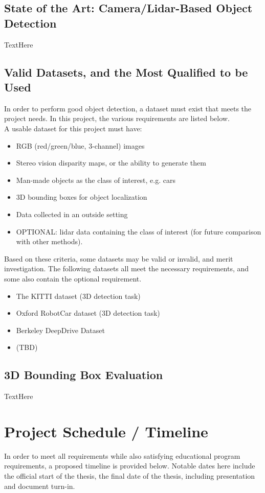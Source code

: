 \subsection{State of the Art: Camera/Lidar-Based Object Detection}
TextHere

\subsection{Valid Datasets, and the Most Qualified to be Used}
In order to perform good object detection, a dataset must exist that meets the project needs. In this project, the various requirements are listed below. \\

A usable dataset for this project must have: 
\begin{itemize} \itemsep=-0.5em
    \item RGB (red/green/blue, 3-channel) images
    \item Stereo vision disparity maps, or the ability to generate them
    \item Man-made objects as the class of interest, e.g. cars
    \item 3D bounding boxes for object localization
    \item Data collected in an outside setting
    \item OPTIONAL: lidar data containing the class of interest (for future comparison with other methods).
\end{itemize}

Based on these criteria, some datasets may be valid or invalid, and merit investigation. The following datasets all meet the necessary requirements, and some also contain the optional requirement.
\begin{itemize} \itemsep=-0.5em
    \item The KITTI dataset (3D detection task)
    \item Oxford RobotCar dataset (3D detection task)
    \item Berkeley DeepDrive Dataset
    \item (TBD)
\end{itemize}


\subsection{3D Bounding Box Evaluation}
TextHere

\section{Project Schedule / Timeline}
In order to meet all requirements while also satisfying educational program requirements, a proposed timeline is provided below. Notable dates here include the official start of the thesis, the final date of the thesis, including presentation and document turn-in.

